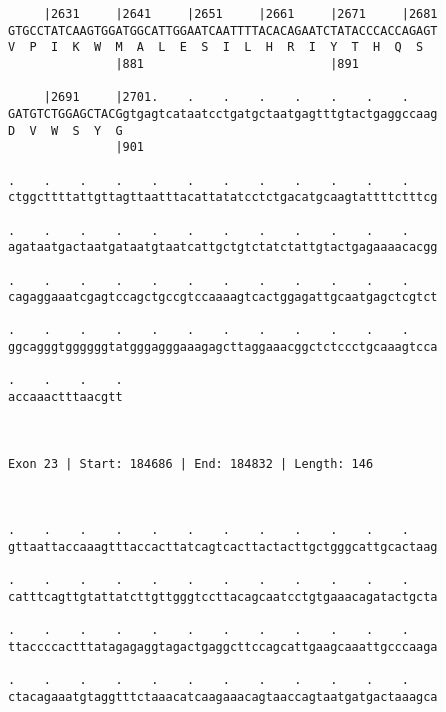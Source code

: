\documentclass{article}
\begin{document}
\begin{Verbatim}
     |2631     |2641     |2651     |2661     |2671     |2681
GTGCCTATCAAGTGGATGGCATTGGAATCAATTTTACACAGAATCTATACCCACCAGAGT
V  P  I  K  W  M  A  L  E  S  I  L  H  R  I  Y  T  H  Q  S  
               |881                          |891           
  
     |2691     |2701.    .    .    .    .    .    .    .    
GATGTCTGGAGCTACGgtgagtcataatcctgatgctaatgagtttgtactgaggccaag
D  V  W  S  Y  G                                            
               |901                                         
  
.    .    .    .    .    .    .    .    .    .    .    .    
ctggcttttattgttagttaatttacattatatcctctgacatgcaagtattttctttcg
                                                            
.    .    .    .    .    .    .    .    .    .    .    .    
agataatgactaatgataatgtaatcattgctgtctatctattgtactgagaaaacacgg
                                                            
.    .    .    .    .    .    .    .    .    .    .    .    
cagaggaaatcgagtccagctgccgtccaaaagtcactggagattgcaatgagctcgtct
                                                            
.    .    .    .    .    .    .    .    .    .    .    .    
ggcagggtggggggtatgggagggaaagagcttaggaaacggctctccctgcaaagtcca
                                                            
.    .    .    .
accaaactttaacgtt
                
                
 
Exon 23 | Start: 184686 | End: 184832 | Length: 146



.    .    .    .    .    .    .    .    .    .    .    .    
gttaattaccaaagtttaccacttatcagtcacttactacttgctgggcattgcactaag
                                                            
.    .    .    .    .    .    .    .    .    .    .    .    
catttcagttgtattatcttgttgggtccttacagcaatcctgtgaaacagatactgcta
                                                            
.    .    .    .    .    .    .    .    .    .    .    .    
ttaccccactttatagagaggtagactgaggcttccagcattgaagcaaattgcccaaga
                                                            
.    .    .    .    .    .    .    .    .    .    .    .    
ctacagaaatgtaggtttctaaacatcaagaaacagtaaccagtaatgatgactaaagca
                                                            

\end{Verbatim}
\end{document}
